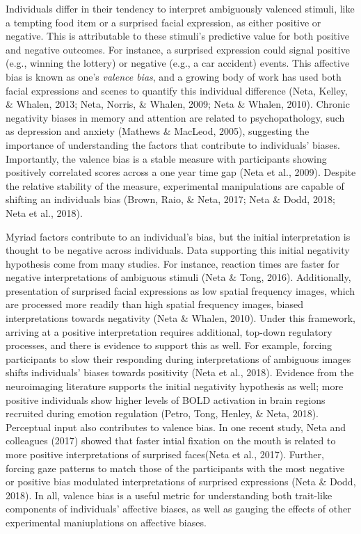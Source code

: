 \documentclass[man]{apa6}
\begin{document}
Individuals differ in their tendency to interpret ambiguously valenced stimuli, like a tempting food item or a surprised facial expression, as either positive or negative. This is attributable to these stimuli's predictive value for both positive and negative outcomes. For instance, a surprised expression could signal positive (e.g., winning the lottery) or negative (e.g., a car accident) events. This affective bias is known as one's \emph{valence bias}, and a growing body of work has used both facial expressions and scenes to quantify this individual difference (Neta, Kelley, \& Whalen, 2013; Neta, Norris, \& Whalen, 2009; Neta \& Whalen, 2010). Chronic negativity biases in memory and attention are related to psychopathology, such as depression and anxiety (Mathews \& MacLeod, 2005), suggesting the importance of understanding the factors that contribute to individuals' biases. Importantly, the valence bias is a stable measure with participants showing positively correlated scores across a one year time gap (Neta et al., 2009). Despite the relative stability of the measure, experimental manipulations are capable of shifting an individuals bias (Brown, Raio, \& Neta, 2017; Neta \& Dodd, 2018; Neta et al., 2018).

Myriad factors contribute to an individual's bias, but the initial interpretation is thought to be negative across individuals. Data supporting this initial negativity hypothesis come from many studies. For instance, reaction times are faster for negative interpretations of ambiguous stimuli (Neta \& Tong, 2016). Additionally, presentation of surprised facial expressions as low spatial frequency images, which are processed more readily than high spatial frequency images, biased interpretations towards negativity (Neta \& Whalen, 2010). Under this framework, arriving at a positive interpretation requires additional, top-down regulatory processes, and there is evidence to support this as well. For example, forcing participants to slow their responding during interpretations of ambiguous images shifts individuals' biases towards positivity (Neta et al., 2018). Evidence from the neuroimaging literature supports the initial negativity hypothesis as well; more positive individuals show higher levels of BOLD activation in brain regions recruited during emotion regulation (Petro, Tong, Henley, \& Neta, 2018). Perceptual input also contributes to valence bias. In one recent study, Neta and colleagues (2017) showed that faster intial fixation on the mouth is related to more positive interpretations of surprised faces(Neta et al., 2017). Further, forcing gaze patterns to match those of the participants with the most negative or positive bias modulated interpretations of surprised expressions (Neta \& Dodd, 2018). In all, valence bias is a useful metric for understanding both trait-like components of individuals' affective biases, as well as gauging the effects of other experimental maniuplations on affective biases.
\end{document}
